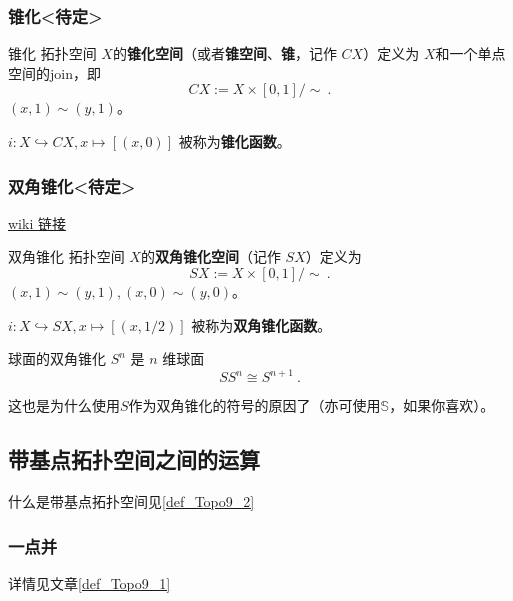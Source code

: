 \subsubsection{锥化<待定>}

\begin{definition}{锥化}
拓扑空间 $X$的\textbf{锥化空间}（或者\textbf{锥空间}、\textbf{锥}，记作 $C X$）定义为 $X$和一个单点空间的join，即
\[
    C X := X \times [0,1] / \sim~.
\]
$(x, 1) \sim (y, 1)$。

$i: X \hookrightarrow C X, x \mapsto [(x, 0)]$ 被称为\textbf{锥化函数}。
\end{definition}


\subsubsection{双角锥化<待定>}

\href{https://en.wikipedia.org/wiki/Suspension_(topology)}{wiki 链接}

\begin{definition}{双角锥化}
拓扑空间 $X$的\textbf{双角锥化空间}（记作 $S X$）定义为
\[
    S X := X \times [0,1] / \sim~.
\]
$(x, 1) \sim (y, 1), (x, 0) \sim (y, 0)$。

$i: X \hookrightarrow S X, x \mapsto [(x, 1/2)]$ 被称为\textbf{双角锥化函数}。
\end{definition}

\begin{theorem}{球面的双角锥化}
$S^n$ 是 $n$ 维球面
\[
S S^n \cong S^{n+1}~.
\]
\end{theorem}
这也是为什么使用$S$作为双角锥化的符号的原因了（亦可使用$\mathbb{S}$，如果你喜欢）。


\subsection{带基点拓扑空间之间的运算}

什么是带基点拓扑空间见\autoref{def_Topo9_2}~

\subsubsection{一点并}

详情见文章\autoref{def_Topo9_1}~


